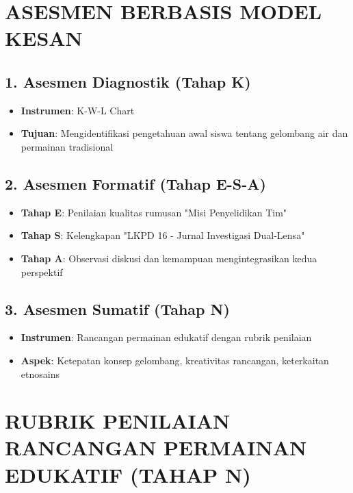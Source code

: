 \documentclass[12pt,a4paper]{article}
\begin{document}
\section{ASESMEN BERBASIS MODEL KESAN}

\subsection{1. Asesmen Diagnostik (Tahap K)}
\begin{itemize}
\item \textbf{Instrumen}: K-W-L Chart
\item \textbf{Tujuan}: Mengidentifikasi pengetahuan awal siswa tentang gelombang air dan permainan tradisional
\end{itemize}

\subsection{2. Asesmen Formatif (Tahap E-S-A)}
\begin{itemize}
\item \textbf{Tahap E}: Penilaian kualitas rumusan "Misi Penyelidikan Tim"
\item \textbf{Tahap S}: Kelengkapan "LKPD 16 - Jurnal Investigasi Dual-Lensa"  
\item \textbf{Tahap A}: Observasi diskusi dan kemampuan mengintegrasikan kedua perspektif
\end{itemize}

\subsection{3. Asesmen Sumatif (Tahap N)}
\begin{itemize}
\item \textbf{Instrumen}: Rancangan permainan edukatif dengan rubrik penilaian
\item \textbf{Aspek}: Ketepatan konsep gelombang, kreativitas rancangan, keterkaitan etnosains
\end{itemize}

\section{RUBRIK PENILAIAN RANCANGAN PERMAINAN EDUKATIF (TAHAP N)}
\end{document}
